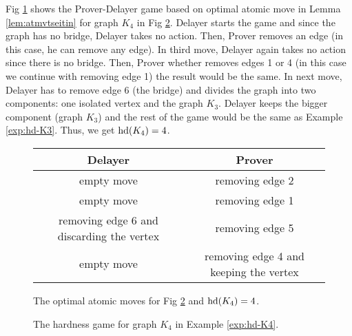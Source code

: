 \documentclass{report}
\begin{document}
\begin{examp}\label{exp:hd-K4}
Fig \ref{fig:game2} shows the Prover-Delayer game based on optimal atomic move in Lemma \ref{lem:atmvtseitin} for graph $K_4$ in Fig \ref{fig:hd2}. Delayer starts the game and since the graph has no bridge, Delayer takes no action. Then, Prover removes an edge (in this case, he can remove any edge). In third move, Delayer again takes no action since there is no bridge. Then, Prover whether removes edges 1 or 4 (in this case we continue with removing edge 1) the result would be the same. In next move, Delayer has to remove edge 6 (the bridge) and divides the graph into two components: one isolated vertex and the graph $K_3$. Delayer keeps the bigger component (graph $K_3$) and the rest of the game would be the same as Example \ref{exp:hd-K3}. Thus, we get $\operatorname{hd}(K_4)=4$.
  \begin{figure}%
  \centering
  \begin{tabular}{|c|c|} 
  \hline
                  Delayer & Prover \\ \hline
                  empty move & removing edge 2  \\ \hline
                  empty move & removing edge 1  \\ \hline
                  removing edge 6 and discarding the vertex & removing edge 5  \\ \hline
                  empty move & removing edge 4 and keeping the vertex\\ \hline
  \end{tabular}
  \caption{The optimal atomic moves for Fig \ref{fig:hd2} and  $\operatorname{hd}(K_4)=4$.} \label{fig:game2}
  \end{figure}
  \begin{figure}
  \begin{center}
  \caption{The hardness game for graph $K_4$ in Example \ref{exp:hd-K4}.}  \label{fig:hd2}
  \end{center}
  \end{figure}	   
\end{examp}
\end{document}
